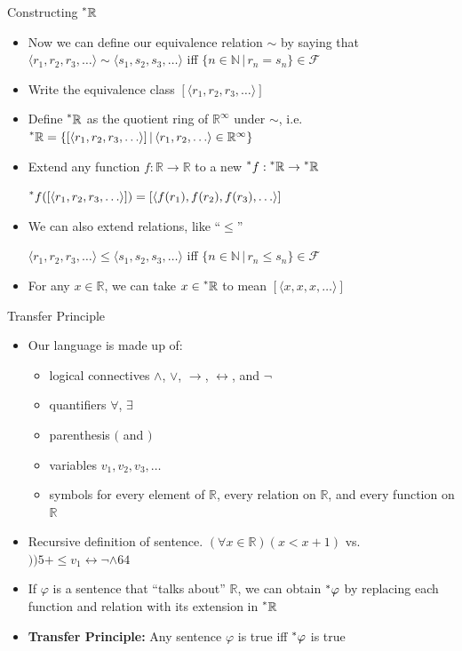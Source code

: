 \documentclass{beamer}
\theoremstyle{plain}
\theoremstyle{definition}
\newcommand{\sthat}{\,|\,}
\newcommand{\reals}{\mathbb{R}}
\newcommand{\hreals}{\prescript{*}{}{\mathbb{R}}}
\newcommand{\nats}{\mathbb{N}}
\newcommand{\hr}[1]{\prescript{*}{}{#1}}
\begin{document}
\begin{frame}{Constructing $\hreals$}
\begin{itemize}
\setlength{\itemsep}{8pt}

\item Now we can define our equivalence relation $\sim$ by saying that $\langle r_1, r_2, r_3, \ldots \rangle \sim \langle s_1, s_2, s_3, \ldots \rangle$ iff $\{n \in \nats \sthat r_n = s_n \} \in \mathcal{F}$ 

\item Write the equivalence class $[\langle r_1, r_2, r_3, \ldots \rangle]$

\item Define $\hreals$ as the quotient ring of $\reals^\infty$ under $\sim$, i.e. $\hreals = \{[\langle r_1, r_2, r_3, \ldots \rangle] \sthat \langle r_1, r_2, \ldots \rangle \in \reals^\infty\}$

\item Extend any function $f: \reals \to \reals$ to a new $\hr{f}: \hreals \to \hreals$

$\hr{f}([\langle r_1, r_2, r_3, \ldots \rangle]) = [\langle f(r_1), f(r_2), f(r_3), \ldots \rangle]$

\item We can also extend relations, like ``$\leq$'' 

$\langle r_1, r_2, r_3, \ldots \rangle \leq \langle s_1, s_2, s_3, \ldots \rangle$ iff $\{n \in \nats \sthat r_n \leq s_n\} \in \mathcal{F}$

\item For any $x \in \reals$, we can take $x \in \hreals$ to mean $[\langle x, x, x, \ldots \rangle]$
\end{itemize}
\end{frame}

\begin{frame}{Transfer Principle}
\begin{itemize}
\item Our language is made up of:
	\begin{itemize}
	\item logical connectives $\land$, $\lor$, $\to$, $\leftrightarrow$, and $\neg$
	\item quantifiers $\forall$, $\exists$
	\item parenthesis $($ and $)$
	\item variables $v_1, v_2, v_3, \ldots$
	\item symbols for every element of $\reals$, every relation on $\reals$, and every function on $\reals$
	\end{itemize}
\item Recursive definition of sentence. $(\forall x \in \reals)(x < x + 1)$ vs. $))5+\leq v_1 \leftrightarrow \neg \land 64$
\item If $\varphi$ is a sentence that ``talks about'' $\reals$, we can obtain $\hr{\varphi}$ by replacing each function and relation with its extension in $\hreals$
\item \textbf{Transfer Principle:} Any sentence $\varphi$ is true iff $\hr{\varphi}$ is true
\end{itemize}
\end{frame}
\end{document}
